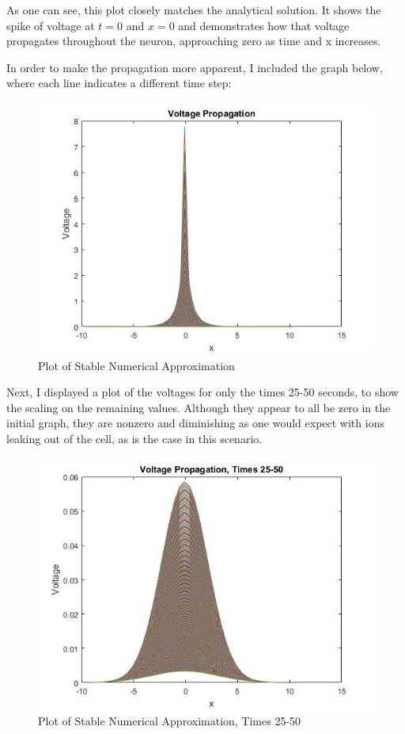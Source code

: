 \documentclass[12pt]{article}
\begin{document}
As one can see, this plot closely matches the analytical solution. It shows the spike of voltage at $t=0$ and $x=0$ and demonstrates how that voltage propagates throughout the neuron, approaching zero as time and x increases. \par
In order to make the propagation more apparent, I included the graph below, where each line indicates a different time step:
\begin{figure}[H]
  \includegraphics[width=\linewidth]{othergraph1.jpg}
  \caption{Plot of Stable Numerical Approximation}
  \label{fig:sketch2}
\end{figure}
Next, I displayed a plot of the voltages for only the times 25-50 seconds, to show the scaling on the remaining values. Although they appear to all be zero in the initial graph, they are nonzero and diminishing as one would expect with ions leaking out of the cell, as is the case in this scenario.
\begin{figure}[H]
  \includegraphics[width=\linewidth]{othergraph2.jpg}
  \caption{Plot of Stable Numerical Approximation, Times 25-50}
  \label{fig:sketch2}
\end{figure}
\end{document}
